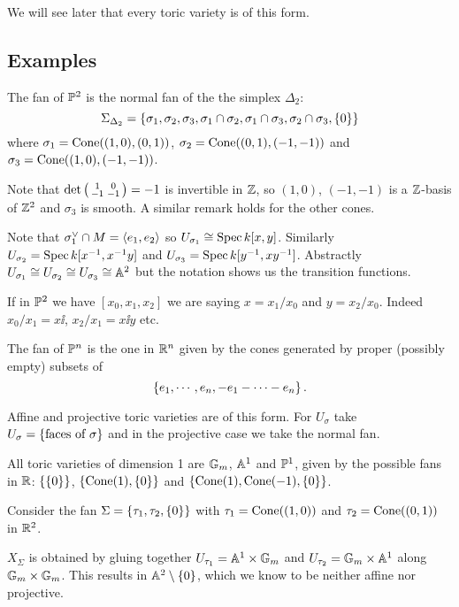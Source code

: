 We will see later that every toric variety is of this form.

\subsection{Examples}

\begin{example}
The fan of $\mathbb{P}^2$ is the normal fan of the the simplex $\Delta_2$:
\[\Sigma_{\Delta_2}=\left\{{\sigma_1,\sigma_2,\sigma_3,\sigma_1\cap\sigma_2,\sigma_1\cap\sigma_3,\sigma_2\cap\sigma_3,\left\{{0}\right\}}\right\}\]
where $\sigma_1=\operatorname{Cone}((1,0),(0,1))$, $\sigma_2=\operatorname{Cone}((0,1),(-1,-1))$ and $\sigma_3=\operatorname{Cone}((1,0),(-1,-1))$.


Note that $\det\left({\begin{smallmatrix}1&0\\-1&-1\end{smallmatrix}}\right)=-1$ is invertible in $\mathbb{Z}$, so $(1,0)$, $(-1,-1)$ is a $\mathbb{Z}$-basis of $\mathbb{Z}^2$ and $\sigma_3$ is smooth. A similar remark holds for the other cones.

Note that $\sigma_1^\vee\cap M=\left\langle {e_1,e_2}\right\rangle$ so $U_{\sigma_1}\cong \operatorname{Spec} k[x,y]$. Similarly $U_{\sigma_2}=\operatorname{Spec} k[x^{-1},x^{-1} y]$ and $U_{\sigma_3}=\operatorname{Spec} k[y^{-1},x y^{-1}]$. Abstractly $U_{\sigma_1}\cong U_{\sigma_2}\cong U_{\sigma_3}\cong \mathbb{A}^2$ but the notation shows us the transition functions.

If in $\mathbb{P}^2$ we have $[x_0,x_1,x_2]$ we are saying $x=x_1/x_0$ and $y=x_2/x_0$. Indeed $x_0/x_1=x\ii$, $x_2/x_1=x\ii y$ etc.
\end{example}

\begin{example}
The fan of $\mathbb{P}^n$ is the one in $\mathbb{R}^n$ given by the cones generated by proper (possibly empty) subsets of
\[\left\{{e_1,\cdots, e_n, -e_1-\cdots-e_n}\right\}.\]
\end{example}

\begin{example}
Affine and projective toric varieties are of this form. For $U_\sigma$ take $U_\sigma=\left\{{\text{faces of $\sigma$}}\right\}$ and in the projective case we take the normal fan.
\end{example}


\begin{remark}
All toric varieties of dimension 1 are $\mathbb{G}_m$, $\mathbb{A}^1$ and $\mathbb{P}^1$, given by the possible fans in $\mathbb{R}$: $\left\{{\left\{{0}\right\}}\right\}$, $\left\{{\operatorname{Cone}(1), \left\{{0}\right\}}\right\}$ and $\left\{{\operatorname{Cone}(1),\operatorname{Cone}(-1),\left\{{0}\right\}}\right\}$.
\end{remark}


\begin{example}
Consider the fan $\Sigma=\left\{{\tau_1,\tau_2,\left\{{0}\right\}}\right\}$ with $\tau_1=\operatorname{Cone}((1,0))$ and $\tau_2=\operatorname{Cone}((0,1))$ in $\mathbb{R}^2$.

$X_\Sigma$ is obtained by gluing together $U_{\tau_1}=\mathbb{A}^1\times \mathbb{G}_m$ and $U_{\tau_2}=\mathbb{G}_m\times \mathbb{A}^1$ along $\mathbb{G}_m\times\mathbb{G}_m$. This results in $\mathbb{A}^2\setminus\{0\}$, which we know to be neither affine nor projective.
\end{example}

